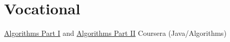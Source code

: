 \documentclass[11pt,a4paper,oneside,roman]{moderncv}
\begin{document}
\section{Vocational}
        {\href{https://www.coursera.org/course/algs4partI}{Algorithms Part I} and \href{https://www.coursera.org/course/algs4partII}{Algorithms Part II}}
        {Coursera}
        {(Java/Algorithms)}{}{}
\end{document}
